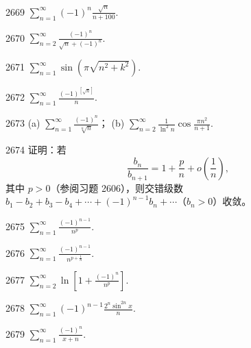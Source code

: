 \begin{prob}[S]{2669}
$\sum_{n=1}^{\infty} (-1)^n \frac{\sqrt{n}}{n+100}$.
\end{prob}

\begin{prob}[S]{2670}
$\sum_{n=2}^{\infty} \frac{(-1)^n}{\sqrt{n} + (-1)^n}$.
\end{prob}

\begin{prob}[S]{2671}
$\sum_{n=1}^{\infty} \sin \left(\pi \sqrt{n^2 + k^2}\right)$.
\end{prob}

\begin{prob}[S]{2672}
$\sum_{n=1}^{\infty} \frac{(-1)^{[\sqrt{n}]}}{n}$.
\end{prob}

\begin{prob}[M]{2673}
(a) $\sum_{n=1}^{\infty} \frac{(-1)^n}{\sqrt[n]{n}}$； \qquad (b) $\sum_{n=2}^{\infty} \frac{1}{\ln^2 n} \cos \frac{\pi n^2}{n+1}$.
\end{prob}

\begin{prob}[M]{2674}
证明：若
\[\frac{b_n}{b_{n+1}} = 1 + \frac{p}{n} + o\left(\frac{1}{n}\right),\]
其中 $p > 0$（参阅习题 2606），则交错级数 $b_1 - b_2 + b_3 - b_4 + \cdots + (-1)^{n-1} b_n + \cdots$（$b_n > 0$）收敛。
\end{prob}


\begin{prob}[S]{2675}
$\sum_{n=1}^{\infty} \frac{(-1)^{n-1}}{n^p}$.
\end{prob}

\begin{prob}[S]{2676}
$\sum_{n=1}^{\infty} \frac{(-1)^{n-1}}{n^{p + \frac{1}{n}}}$.
\end{prob}

\begin{prob}[S]{2677}
$\sum_{n=2}^{\infty} \ln \left[1 + \frac{(-1)^n}{n^p}\right]$.
\end{prob}

\begin{prob}[S]{2678}
$\sum_{n=1}^{\infty} (-1)^{n-1} \frac{2^n \sin^{2n} x}{n}$.
\end{prob}

\begin{prob}[S]{2679}
$\sum_{n=1}^{\infty} \frac{(-1)^n}{x + n}$.
\end{prob}

